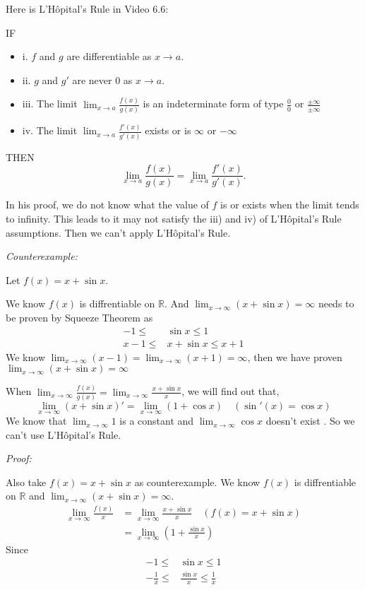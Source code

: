 \documentclass[12pt]{exam}
\newcommand*\circled[1]{\tikz[baseline=(char.base)]{
    \node[shape=circle, draw, inner sep=1pt, 
        minimum height=12pt] (char) {#1};}}
\newcommand{\R}{\mathbb{R}}
\begin{document}
\begin{enumerate}
\begin{enumerate}
			Here is L'H\^{o}pital's Rule in Video 6.6:
			
			IF
			\begin{itemize}
			    \item i. $f$ and $g$ are differentiable as $x \to a$.
			    \item ii. $g$ and $g'$ are never $0$ as $x \to a$.
			    \item iii. The limit $\lim_{x \to a}\frac{f(x)}{g(x)}$ is an indeterminate form of type $\frac{0}{0}$ or $\frac{\pm\infty}{\pm\infty}$
			    \item iv. The limit $\lim_{x \to a}\frac{f'(x)}{g'(x)}$ exists or is $\infty$ or $-\infty$
			    
			\end{itemize}
			THEN
			$$
			    \lim_{x \to a}\frac{f(x)}{g(x)}=\lim_{x \to a}\frac{f'(x)}{g'(x)}.
			$$
			
			In his proof, we do not know what the value of $f$ is or exists when the limit tends to infinity. This leads to it may not satisfy the iii) and iv) of L'H\^{o}pital's Rule assumptions. Then we can't apply L'H\^{o}pital's Rule.
			
			\emph{Counterexample:}
			
			Let $f(x)=x+\sin{x}$.
			
			We know $f(x)$ is diffrentiable on $\R$.
			And $\lim_{x \to \infty}(x+\sin{x})=\infty$ needs to be proven by Squeeze Theorem as
			\begin{align*}
			    -1\leq&\sin{x}\leq 1\\
			    x-1\leq&x+\sin{x}\leq x+1
			\end{align*}
			We know $\lim_{x \to \infty}(x-1)=\lim_{x \to \infty}(x+1)=\infty$, then we have proven $\lim_{x \to \infty}(x+\sin{x})=\infty$ \circled{6}
			
			When $\lim_{x \to \infty}\frac{f(x)}{g(x)}=\lim_{x \to \infty}\frac{x+\sin{x}}{x}$, we will find out that,
			$$
			    \lim_{x \to \infty}(x+\sin{x})'=\lim_{x \to \infty}(1+\cos{x})\quad(\sin'(x)=\cos{x})
			$$
			We know that $\lim_{x \to \infty}1$ is a constant and $\lim_{x \to \infty}\cos{x}$ doesn't exist \circled{7}. So we can't use L'H\^{o}pital's Rule.
			
			\emph{Proof:}
			
			Also take $f(x)=x+\sin{x}$ as counterexample.
			We know $f(x)$ is diffrentiable on $\R$ and $\lim_{x \to \infty}(x+\sin{x})=\infty$. \circled{6}
			\begin{align*}
			    \lim_{x \to \infty}\frac{f(x)}{x}&=\lim_{x \to \infty}\frac{x+\sin{x}}{x}\quad(f(x)=x+\sin{x})\\
			    &=\lim_{x \to \infty}(1+\frac{\sin{x}}{x})
			\end{align*}
			Since
		    \begin{align*}
		        -1\leq&\sin{x}\leq1\\
		        -\frac{1}{x}\leq&\frac{\sin{x}}{x}\leq\frac{1}{x}
		     \end{align*}
		

\end{enumerate}
\end{enumerate}
\end{document}
